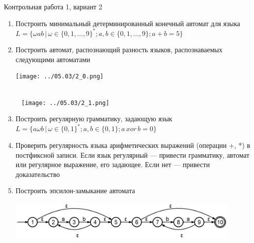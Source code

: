\documentclass[12pt]{article}
\begin{document}

{\Large Контрольная работа 1, вариант 2}
\bigskip

\begin{enumerate}
  \item Построить минимальный детерминированный конечный автомат для языка \\ $L = \{ \omega a b \, | \, \omega \in \{ 0, 1, \dots, 9 \}^*; a, b \in \{ 0, 1, \dots, 9 \}; a + b = 5 \} $
  \item { 
         Построить автомат, распознающий разность языков, распознаваемых следующими автоматами
         
         \texttt{[image: ../05.03/2\_0.png]}
         
~\\~
         \texttt{[image: ../05.03/2\_1.png]} 
        }
    \item Построить регулярную грамматику, задающую язык \\ $L = \{ a \omega b \, | \, \omega \in \{ 0, 1 \}^*; a, b \in \{ 0, 1 \}; a \, xor \, b = 0 \} $
    \item Проверить регулярность языка арифметических выражений (операции +, *) в постфиксной записи. Если язык регулярный --- привести грамматику, автомат или регулярное выражение, его задающее. Если нет --- привести доказательство
    \item {Построить эпсилон-замыкание автомата
           
           \includegraphics[width=0.9\textwidth]{test1b_ec.PNG}
    }
\end{enumerate}
\end{document}
